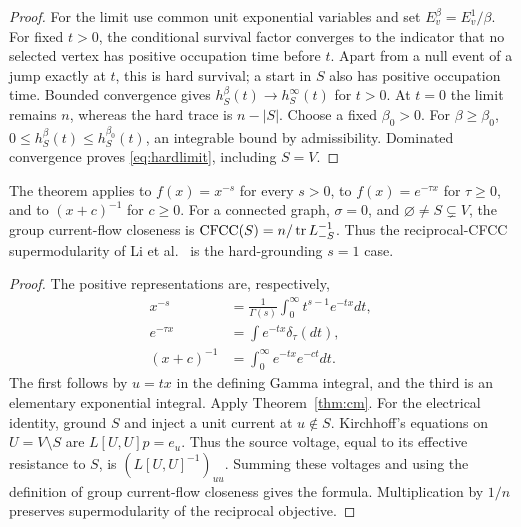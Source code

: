\begin{proof}
For the limit use common unit exponential variables and set
$E_v^{\beta}=E_v^1/\beta$. For fixed $t>0$, the conditional survival
factor converges to the indicator that no selected vertex has positive
occupation time before $t$. Apart from a null event of a jump exactly
at $t$, this is hard survival; a start in $S$ also has positive
occupation time. Bounded convergence gives
$h_S^\beta(t)\to h_S^\infty(t)$ for $t>0$.
At $t=0$ the limit remains $n$, whereas the hard trace is $n-|S|$.
Choose a fixed $\beta_0>0$. For $\beta\geq\beta_0$,
$0\leq h_S^\beta(t)\leq h_S^{\beta_0}(t)$, an integrable bound by
admissibility. Dominated convergence proves \eqref{eq:hardlimit},
including $S=V$.
\end{proof}

\begin{corollary}\label{cor:instances}
The theorem applies to $f(x)=x^{-s}$ for every $s>0$, to
$f(x)=e^{-\tau x}$ for $\tau\geq0$, and to $(x+c)^{-1}$ for $c\geq0$.
For a connected graph, $\sigma=0$, and $\varnothing\ne S\subsetneq V$,
the group current-flow closeness is
$\operatorname{CFCC}(S)=n/\operatorname{tr} L_{-S}^{-1}$.
Thus the reciprocal-CFCC supermodularity of Li et al.~\cite{li2019}
is the hard-grounding $s=1$ case.
\end{corollary}
\begin{proof}
The positive representations are, respectively,
\begin{align*}
 x^{-s}&=\frac1{\Gamma(s)}\int_0^\infty t^{s-1}e^{-tx}dt,\\
 e^{-\tau x}&=\int e^{-tx}\delta_\tau(dt),\\
 (x+c)^{-1}&=\int_0^\infty e^{-tx}e^{-ct}dt.
\end{align*}
The first follows by $u=tx$ in the defining Gamma integral, and the
third is an elementary exponential integral. Apply Theorem~\ref{thm:cm}.
For the electrical identity, ground $S$ and inject a unit current at
$u\notin S$. Kirchhoff's equations on $U=V\setminus S$ are
$L[U,U]p=e_u$. Thus the source voltage, equal to its effective
resistance to $S$, is $(L[U,U]^{-1})_{uu}$. Summing these voltages
and using the definition of group current-flow closeness gives the
formula. Multiplication by $1/n$ preserves supermodularity of the
reciprocal objective.
\end{proof}

